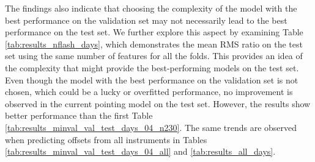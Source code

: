 The findings also indicate that choosing the complexity of the model with the best performance on the validation set may not necessarily lead to the best performance on the test set.
We further explore this aspect by examining Table \ref{tab:results_nflash_days}, which demonstrates the mean RMS ratio on the test set using the same number of features for all the folds.
This provides an idea of the complexity that might provide the best-performing models on the test set.
Even though the model with the best performance on the validation set is not chosen, which could be a lucky or overfitted performance,
no improvement is observed in the current pointing model on the test set.
However, the results show better performance than the first Table \ref{tab:results_minval_val_test_days_04_n230}.
The same trends are observed when predicting offsets from all instruments in Tables \ref{tab:results_minval_val_test_days_04_all} and \ref{tab:results_all_days}. \\



